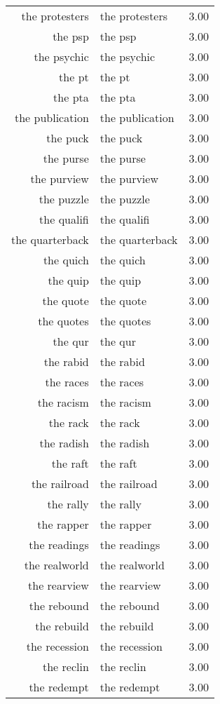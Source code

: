 \begin{table}[ht]
\begin{tabular}{rlr}
  the protesters & the protesters & 3.00 \\ 
  the psp & the psp & 3.00 \\ 
  the psychic & the psychic & 3.00 \\ 
  the pt & the pt & 3.00 \\ 
  the pta & the pta & 3.00 \\ 
  the publication & the publication & 3.00 \\ 
  the puck & the puck & 3.00 \\ 
  the purse & the purse & 3.00 \\ 
  the purview & the purview & 3.00 \\ 
  the puzzle & the puzzle & 3.00 \\ 
  the qualifi & the qualifi & 3.00 \\ 
  the quarterback & the quarterback & 3.00 \\ 
  the quich & the quich & 3.00 \\ 
  the quip & the quip & 3.00 \\ 
  the quote & the quote & 3.00 \\ 
  the quotes & the quotes & 3.00 \\ 
  the qur & the qur & 3.00 \\ 
  the rabid & the rabid & 3.00 \\ 
  the races & the races & 3.00 \\ 
  the racism & the racism & 3.00 \\ 
  the rack & the rack & 3.00 \\ 
  the radish & the radish & 3.00 \\ 
  the raft & the raft & 3.00 \\ 
  the railroad & the railroad & 3.00 \\ 
  the rally & the rally & 3.00 \\ 
  the rapper & the rapper & 3.00 \\ 
  the readings & the readings & 3.00 \\ 
  the realworld & the realworld & 3.00 \\ 
  the rearview & the rearview & 3.00 \\ 
  the rebound & the rebound & 3.00 \\ 
  the rebuild & the rebuild & 3.00 \\ 
  the recession & the recession & 3.00 \\ 
  the reclin & the reclin & 3.00 \\ 
  the redempt & the redempt & 3.00 \\ 

\end{tabular}
\end{table}
